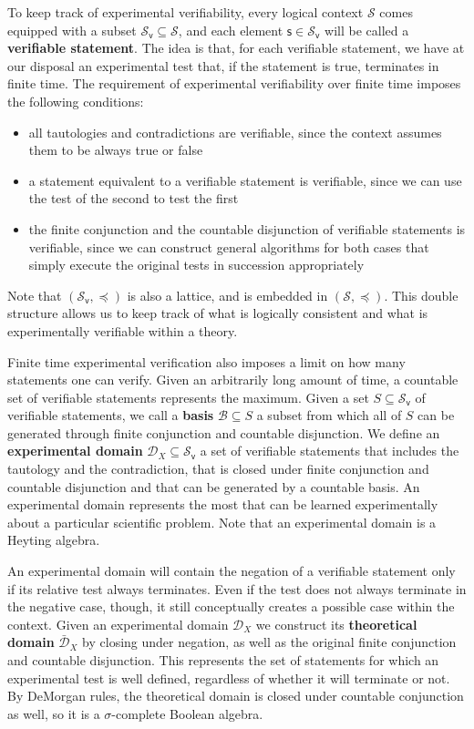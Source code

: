 \documentclass{article}
\def\logCtx{\mathcal{S}}
\def\vstmtSet{\mathcal{S}_\textsf{v}}
\newcommand{\stmt}[1][s] {\mathsf{#1}} %
\def\narrower{\preccurlyeq} %
\newcommand{\edomain}[1][D] {\mathcal{#1}} %
\newcommand{\tdomain}[1][D] {\bar{\mathcal{#1}}} %
\newcommand{\basis}[1][B] {\mathcal{#1}} %
\begin{document}
To keep track of experimental verifiability, every logical context $\logCtx$ comes equipped with a subset $\vstmtSet \subseteq \logCtx$, and each element $\stmt \in \vstmtSet$ will be called a \textbf{verifiable statement}. The idea is that, for each verifiable statement, we have at our disposal an experimental test that, if the statement is true, terminates in finite time. The requirement of experimental verifiability over finite time imposes the following conditions:
\begin{itemize}
	\item all tautologies and contradictions are verifiable, since the context assumes them to be always true or false
	\item a statement equivalent to a verifiable statement is verifiable, since we can use the test of the second to test the first
	\item the finite conjunction and the countable disjunction of verifiable statements is verifiable, since we can construct general algorithms for both cases that simply execute the original tests in succession appropriately
\end{itemize}
Note that $(\vstmtSet, \narrower)$ is also a lattice, and is embedded in $(\logCtx, \narrower)$. This double structure allows us to keep track of what is logically consistent and what is experimentally verifiable within a theory.

Finite time experimental verification also imposes a limit on how many statements one can verify. Given an arbitrarily long amount of time, a countable set of verifiable statements represents the maximum. Given a set $S \subseteq \vstmtSet$ of verifiable statements, we call a \textbf{basis} $\basis \subseteq S$ a subset from which all of $S$ can be generated through finite conjunction and countable disjunction. We define an \textbf{experimental domain} $\edomain_X \subseteq \vstmtSet$ a set of verifiable statements that includes the tautology and the contradiction, that is closed under finite conjunction and countable disjunction and that can be generated by a countable basis. An experimental domain represents the most that can be learned experimentally about a particular scientific problem. Note that an experimental domain is a Heyting algebra.

An experimental domain will contain the negation of a verifiable statement only if its relative test always terminates. Even if the test does not always terminate in the negative case, though, it still conceptually creates a possible case within the context. Given an experimental domain $\edomain_X$ we construct its \textbf{theoretical domain} $\tdomain_X$ by closing under negation, as well as the original finite conjunction and countable disjunction. This represents the set of statements for which an experimental test is well defined, regardless of whether it will terminate or not. By DeMorgan rules, the theoretical domain is closed under countable conjunction as well, so it is a $\sigma$-complete Boolean algebra.
\end{document}
